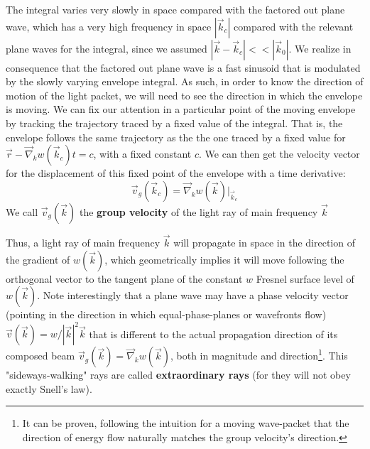\documentclass[11pt, a4paper, twoside]{article} %
\begin{document}
{The integral varies very slowly in space compared with the factored out plane wave, which has a very high frequency in space $|\vec{k}_c|$ compared with the relevant plane waves for the integral, since we assumed  $|\vec{k}-\vec{k}_c|<<|\vec{k}_0|$. We realize in consequence that the factored out plane wave is a fast sinusoid that is modulated by the slowly varying envelope integral. As such, in order to know the direction of motion of the light packet, we will need to see the direction in which the envelope is moving. We can fix our attention in a particular point of the moving envelope by tracking the trajectory traced by a fixed value of the integral. That is, the envelope follows the same trajectory as the the one traced by a fixed value for $\vec{r}-\vec{\nabla}_kw(\vec{k}_c)t=c$, with a fixed constant $c$. We can then get the velocity vector for the displacement of this fixed point of the envelope with a time derivative:
\begin{equation}
\vec{v}_g(\vec{k}_c)=\vec{\nabla}_kw(\vec{k})\Big\rvert_{\vec{k}_c}
\end{equation}
We call $\vec{v}_g(\vec{k})$ the {\bf group velocity} of the light ray of main frequency $\vec{k}$
}

Thus, a light ray of main frequency $\vec{k}$ will propagate in space in the direction of the gradient of $w(\vec{k})$, which geometrically implies it will move following the orthogonal vector to the tangent plane of the constant $w$ Fresnel surface level of $w(\vec{k})$. Note interestingly that a plane wave may have a phase velocity vector (pointing in the direction in which equal-phase-planes or wavefronts flow) $\vec{v}(\vec{k})=w/|\vec{k}|^2\vec{k}$ that is different to the actual propagation direction of its composed beam $\vec{v}_g(\vec{k})=\vec{\nabla}_kw(\vec{k})$, both in magnitude and direction\footnote{It can be proven, following the intuition for a moving wave-packet that the direction of energy flow naturally matches the group velocity's direction.}. This "sideways-walking" rays are called {\bf extraordinary rays} (for they will not obey exactly Snell's law).\vspace{-0.2cm}
\end{document}
